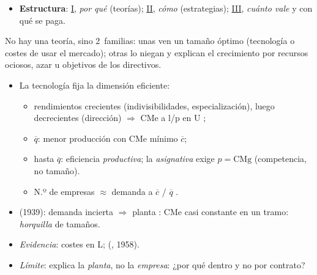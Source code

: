 \documentclass{article}
\begin{document}
\begin{columnas}
\begin{itemize}
\item \textbf{Estructura}: \hyperref[rep:I]{I}, \emph{por qué} (teorías); \hyperref[rep:II]{II}, \emph{cómo} (estrategias); \hyperref[rep:III]{III}, \emph{cuánto vale} y con qué se paga.
\end{itemize}

\begin{ideaclave}
No hay una teoría, sino 2~familias: unas ven un tamaño óptimo (tecnología o costes de usar el mercado); otras lo niegan y explican el crecimiento por recursos ociosos, azar u objetivos de los directivos.
\end{ideaclave}

\begin{itemize}
\item La tecnología fija la dimensión eficiente:
  \begin{itemize}
  \item rendimientos crecientes (indivisibilidades, especialización), luego decrecientes (dirección) $\Rightarrow$ CMe a l/p en U ;
  \item {} $\overline q$: menor producción con CMe mínimo $\overline c$;
  \item hasta $\overline q$: eficiencia \emph{productiva}; la \emph{asignativa} exige $p=\mathrm{CMg}$ (competencia, no tamaño).
  \item N.º de empresas $\approx$ demanda a $\overline c$ / $\overline q$ .
  \end{itemize}
\item {} (1939): demanda incierta $\Rightarrow$ planta : CMe casi constante en un tramo: \emph{horquilla} de tamaños.
\item \emph{Evidencia}: costes en L;  (, 1958).
\item \emph{Límite}: explica la \emph{planta}, no la \emph{empresa}: ¿por qué dentro y no por contrato?
\end{itemize}


\end{columnas}
\end{document}
